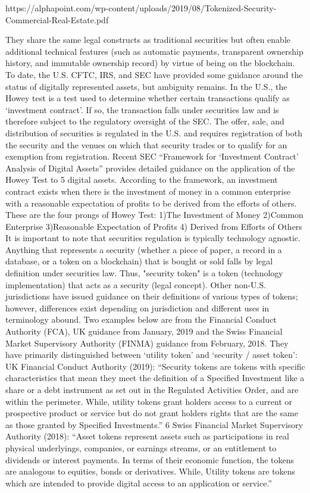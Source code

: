 https://alphapoint.com/wp-content/uploads/2019/08/Tokenized-Security-Commercial-Real-Estate.pdf


 They share the same legal constructs as traditional securities but often enable additional technical features (such as automatic
payments, transparent ownership history, and immutable ownership record) by
virtue of being on the blockchain. To date, the U.S. CFTC, IRS, and SEC have provided
some guidance around the status of digitally represented assets, but ambiguity
remains.
In the U.S., the Howey test is a test used to determine whether certain transactions
qualify as ‘investment contract’. If so, the transaction falls under securities law and is
therefore subject to the regulatory oversight of the SEC. The offer, sale, and
distribution of securities is regulated in the U.S. and requires registration of both the
security and the venues on which that security trades or to qualify for an exemption
from registration. Recent SEC “Framework for ‘Investment Contract’ Analysis of
Digital Assets” provides detailed guidance on the application of the Howey Test to
5
digital assets. According to the framework, an investment contract exists when there
is the investment of money in a common enterprise with a reasonable expectation
of profits to be derived from the efforts of others. These are the four prongs of Howey
Test: 1)The Investment of Money 2)Common Enterprise 3)Reasonable Expectation of
Profits 4) Derived from Efforts of Others
It is important to note that securities regulation is typically technology agnostic.
Anything that represents a security (whether a piece of paper, a record in a database,
or a token on a blockchain) that is bought or sold falls by legal definition under
securities law. Thus, "security token" is a token (technology implementation) that
acts as a security (legal concept).
Other non-U.S. jurisdictions have issued guidance on their definitions of various
types of tokens; however, differences exist depending on jurisdiction and different
uses in terminology abound. Two examples below are from the Financial Conduct
Authority (FCA), UK guidance from January, 2019 and the Swiss Financial Market
Supervisory Authority (FINMA) guidance from February, 2018. They have primarily
distinguished between ‘utility token’ and ‘security / asset token’:
 UK Financial Conduct Authority (2019):
“Security tokens are tokens with specific characteristics that mean they meet
the definition of a Specified Investment like a share or a debt instrument as
set out in the Regulated Activities Order, and are within the perimeter.
While, utility tokens grant holders access to a current or prospective product
or service but do not grant holders rights that are the same as those granted
by Specified Investments.”
6
Swiss Financial Market Supervisory Authority (2018):
“Asset tokens represent assets such as participations in real physical
underlyings, companies, or earnings streams, or an entitlement to dividends
or interest payments. In terms of their economic function, the tokens are
analogous to equities, bonds or derivatives.
While, Utility tokens are tokens which are intended to provide digital access
to an application or service.”

